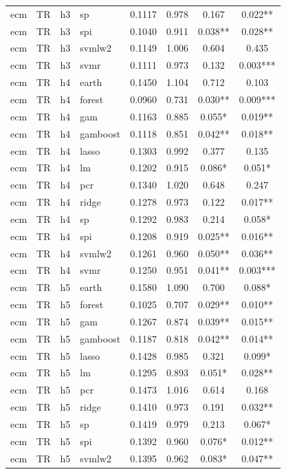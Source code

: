 \begin{ThreePartTable}
\begin{longtable}[t]{llclcccc}
ecm & TR & h3 & sp & 0.1117 & 0.978 & 0.167 & 0.022**\\
ecm & TR & h3 & spi & 0.1040 & 0.911 & 0.038** & 0.028**\\
ecm & TR & h3 & svmlw2 & 0.1149 & 1.006 & 0.604 & 0.435\\
ecm & TR & h3 & svmr & 0.1111 & 0.973 & 0.132 & 0.003***\\
\addlinespace
ecm & TR & h4 & earth & 0.1450 & 1.104 & 0.712 & 0.103\\
ecm & TR & h4 & forest & 0.0960 & 0.731 & 0.030** & 0.009***\\
ecm & TR & h4 & gam & 0.1163 & 0.885 & 0.055* & 0.019**\\
ecm & TR & h4 & gamboost & 0.1118 & 0.851 & 0.042** & 0.018**\\
ecm & TR & h4 & lasso & 0.1303 & 0.992 & 0.377 & 0.135\\
ecm & TR & h4 & lm & 0.1202 & 0.915 & 0.086* & 0.051*\\
ecm & TR & h4 & pcr & 0.1340 & 1.020 & 0.648 & 0.247\\
ecm & TR & h4 & ridge & 0.1278 & 0.973 & 0.122 & 0.017**\\
ecm & TR & h4 & sp & 0.1292 & 0.983 & 0.214 & 0.058*\\
ecm & TR & h4 & spi & 0.1208 & 0.919 & 0.025** & 0.016**\\
ecm & TR & h4 & svmlw2 & 0.1261 & 0.960 & 0.050** & 0.036**\\
ecm & TR & h4 & svmr & 0.1250 & 0.951 & 0.041** & 0.003***\\
\addlinespace
ecm & TR & h5 & earth & 0.1580 & 1.090 & 0.700 & 0.088*\\
ecm & TR & h5 & forest & 0.1025 & 0.707 & 0.029** & 0.010**\\
ecm & TR & h5 & gam & 0.1267 & 0.874 & 0.039** & 0.015**\\
ecm & TR & h5 & gamboost & 0.1187 & 0.818 & 0.042** & 0.014**\\
ecm & TR & h5 & lasso & 0.1428 & 0.985 & 0.321 & 0.099*\\
ecm & TR & h5 & lm & 0.1295 & 0.893 & 0.051* & 0.028**\\
ecm & TR & h5 & pcr & 0.1473 & 1.016 & 0.614 & 0.168\\
ecm & TR & h5 & ridge & 0.1410 & 0.973 & 0.191 & 0.032**\\
ecm & TR & h5 & sp & 0.1419 & 0.979 & 0.213 & 0.067*\\
ecm & TR & h5 & spi & 0.1392 & 0.960 & 0.076* & 0.012**\\
ecm & TR & h5 & svmlw2 & 0.1395 & 0.962 & 0.083* & 0.047**\\

\end{longtable}
\end{ThreePartTable}
